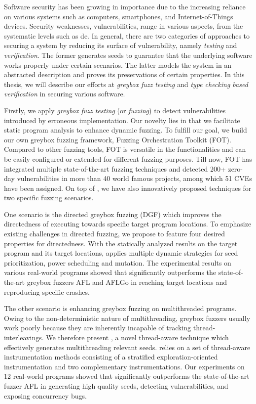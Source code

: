Software security has been growing in importance due to the increasing reliance on various systems such as computers, smartphones, and Internet-of-Things devices. Security weaknesses, vulnerabilities, range in various aspects, from the systematic levels such as de. 
In general, there are two categories of approaches to securing a system by reducing its surface of vulnerability, namely \emph{testing} and \emph{verification}. The former
 generates seeds to guarantee that the underlying software works properly under certain scenarios.
 The latter models the system in an abstracted description and proves its preservations of certain properties.
  In this thesis, we will describe our efforts at \emph{greybox fuzz testing} and \emph{type checking based verification} in securing various software.

Firstly, we apply \emph{greybox fuzz testing} (or \emph{fuzzing}) to detect vulnerabilities introduced by erroneous implementation. Our novelty lies in that we facilitate static program analysis to enhance dynamic fuzzing. To fulfill our goal, we build our own greybox fuzzing framework, Fuzzing Orchestration Toolkit (FOT). Compared to other fuzzing tools, FOT is versatile in the functionalities and can be easily configured or extended for different fuzzing purposes. Till now, FOT has integrated multiple state-of-the-art fuzzing techniques and detected 200+ zero-day vulnerabilities in more than 40 world famous projects, among which 51 CVEs have been assigned.
On top of \FOT, we have also innovatively proposed techniques for two specific fuzzing scenarios.

One scenario is the directed greybox fuzzing (DGF) which improves the directedness of executing towards specific target program locations. To emphasize existing challenges in \mbox{directed} fuzzing, we propose \dFOT to feature four desired properties for directedness. With the statically analyzed results on the target program and its target locations, \dFOT applies multiple dynamic strategies for seed prioritization, power scheduling and \mbox{mutation}.
The experimental results on various real-world \mbox{programs} showed that \dFOT significantly outperforms the state-of-the-art greybox fuzzers AFL and AFLGo in reaching target locations and reproducing specific crashes.

The other scenario is enhancing greybox fuzzing on multithreaded programs. Owing to the non-deterministic nature of multithreading, greybox fuzzers usually work poorly because they are inherently incapable of tracking thread-interleavings.
We therefore present \mtfuzz, a novel thread-aware technique which effectively generates multithreading relevant seeds. \mtfuzz relies on a set of thread-aware instrumentation methods consisting of a stratified exploration-oriented instrumentation and two complementary instrumentations. Our experiments on 12 real-world programs showed that \mtfuzz significantly outperforms the state-of-the-art fuzzer AFL in generating high quality seeds, detecting vulnerabilities, and exposing concurrency bugs.

